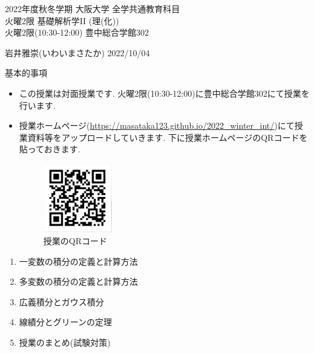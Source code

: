 \documentclass[dvipdfmx,a4paper,11pt]{article}
\theoremstyle{definition}
\begin{document}

\newpage
\begin{center}
{\Large 2022年度秋冬学期 大阪大学 全学共通教育科目 \\ 火曜2限 基礎解析学II (理(化))} \\
火曜2限(10:30-12:00) 豊中総合学館302
\end{center}
\begin{flushright}
 岩井雅崇(いわいまさたか) 2022/10/04 \\
\end{flushright}
{\large 基本的事項}
\begin{itemize}
  \setlength{\parskip}{0cm} %
  \setlength{\itemsep}{0cm} %
\item この授業は対面授業です. 火曜2限(10:30-12:00)に豊中総合学館302にて授業を行います.
\item 授業ホームページ(\url{https://masataka123.github.io/2022_winter_int/})にて授業資料等をアップロードしていきます. 
下に授業ホームページのQRコードを貼っておきます. 
\begin{figure}[htbp]
\begin{center}
 \includegraphics[height=30mm, width=30mm]{cal2.png}
 \caption*{授業のQRコード}
\end{center}
\end{figure}
\end{itemize}

\hspace{-18pt}{\large 授業の予定}
\begin{enumerate}
  \setlength{\parskip}{0cm} %
  \setlength{\itemsep}{0cm} %
  \item 一変数の積分の定義と計算方法
  \item 多変数の積分の定義と計算方法
  \item 広義積分とガウス積分
  \item 線績分とグリーンの定理
  \item 授業のまとめ(試験対策)
 \end{enumerate}
 
\end{document}
